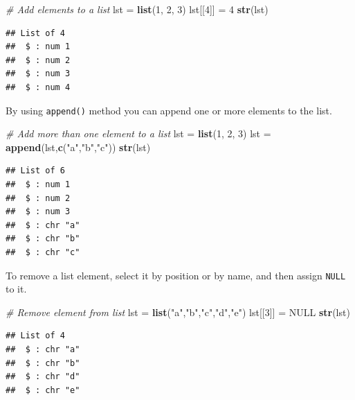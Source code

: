 \documentclass[
]{book}
\newenvironment{Shaded}{\begin{snugshade}}{\end{snugshade}}
\newcommand{\CommentTok}[1]{\textcolor[rgb]{0.56,0.35,0.01}{\textit{#1}}}
\newcommand{\DecValTok}[1]{\textcolor[rgb]{0.00,0.00,0.81}{#1}}
\newcommand{\KeywordTok}[1]{\textcolor[rgb]{0.13,0.29,0.53}{\textbf{#1}}}
\newcommand{\NormalTok}[1]{#1}
\newcommand{\OtherTok}[1]{\textcolor[rgb]{0.56,0.35,0.01}{#1}}
\newcommand{\StringTok}[1]{\textcolor[rgb]{0.31,0.60,0.02}{#1}}
\begin{document}
\begin{Shaded}
\begin{Highlighting}[]
\CommentTok{# Add elements to a list}
\NormalTok{lst =}\StringTok{ }\KeywordTok{list}\NormalTok{(}\DecValTok{1}\NormalTok{, }\DecValTok{2}\NormalTok{, }\DecValTok{3}\NormalTok{)}
\NormalTok{lst[[}\DecValTok{4}\NormalTok{]] =}\StringTok{ }\DecValTok{4}
\KeywordTok{str}\NormalTok{(lst)}
\end{Highlighting}
\end{Shaded}

\begin{verbatim}
## List of 4
##  $ : num 1
##  $ : num 2
##  $ : num 3
##  $ : num 4
\end{verbatim}

By using \texttt{append()} method you can append one or more elements to the list.

\begin{Shaded}
\begin{Highlighting}[]
\CommentTok{# Add more than one element to a list}
\NormalTok{lst =}\StringTok{ }\KeywordTok{list}\NormalTok{(}\DecValTok{1}\NormalTok{, }\DecValTok{2}\NormalTok{, }\DecValTok{3}\NormalTok{)}
\NormalTok{lst =}\StringTok{ }\KeywordTok{append}\NormalTok{(lst,}\KeywordTok{c}\NormalTok{(}\StringTok{"a"}\NormalTok{,}\StringTok{"b"}\NormalTok{,}\StringTok{"c"}\NormalTok{))}
\KeywordTok{str}\NormalTok{(lst)}
\end{Highlighting}
\end{Shaded}

\begin{verbatim}
## List of 6
##  $ : num 1
##  $ : num 2
##  $ : num 3
##  $ : chr "a"
##  $ : chr "b"
##  $ : chr "c"
\end{verbatim}

To remove a list element, select it by position or by name, and then assign \texttt{NULL} to it.

\begin{Shaded}
\begin{Highlighting}[]
\CommentTok{# Remove element from list}
\NormalTok{lst =}\StringTok{ }\KeywordTok{list}\NormalTok{(}\StringTok{"a"}\NormalTok{,}\StringTok{"b"}\NormalTok{,}\StringTok{"c"}\NormalTok{,}\StringTok{"d"}\NormalTok{,}\StringTok{"e"}\NormalTok{)}
\NormalTok{lst[[}\DecValTok{3}\NormalTok{]] =}\StringTok{ }\OtherTok{NULL}
\KeywordTok{str}\NormalTok{(lst)}
\end{Highlighting}
\end{Shaded}

\begin{verbatim}
## List of 4
##  $ : chr "a"
##  $ : chr "b"
##  $ : chr "d"
##  $ : chr "e"
\end{verbatim}
\end{document}
